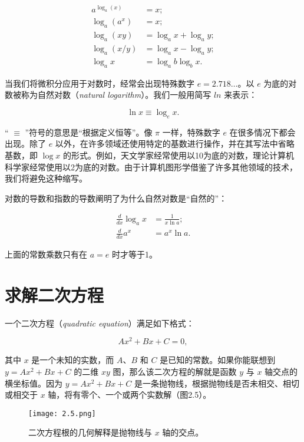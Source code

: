 \documentclass[lang=cn,12pt]{elegantbook}
\begin{document}
$$
  \begin{aligned}
    a^{\log_a(x)} & = x;               \\
    \log_a(a^x)   & = x;               \\
    \log_a(xy)    & = \log_ax+\log_ay; \\
    \log_a(x/y)   & = \log_ax-\log_ay; \\
    \log_ax       & = \log_ab\log_bx.
  \end{aligned}
$$

当我们将微积分应用于对数时，经常会出现特殊数字 $e=2.718\ldots $。以 $e$ 为底的对数被称为自然对数（\textit{natural logarithm}）。我们一般用简写 $ln$ 来表示：

$$\ln x \equiv \log_ex.$$

“ $\equiv$ ”符号的意思是“根据定义恒等”。像 $\pi$ 一样，特殊数字 $e$ 在很多情况下都会出现。除了 $e$ 以外，在许多领域还使用特定的基数进行操作，并在其写法中省略基数，即 $\log x$ 的形式。例如，天文学家经常使用以10为底的对数，理论计算机科学家经常使用以2为底的对数。由于计算机图形学借鉴了许多其他领域的技术，我们将避免这种缩写。

对数的导数和指数的导数阐明了为什么自然对数是“自然的”：

$$
  \begin{aligned}
    \frac{d}{d x} \log _{a} x & =\frac{1}{x \ln a}; \\
    \frac{d}{d x} a^{x}       & =a^{x} \ln a.
  \end{aligned}
$$

上面的常数乘数只有在 $a = e$ 时才等于1。

\section{求解二次方程}

一个二次方程（\textit{quadratic equation}）满足如下格式：

$$ Ax^2+Bx+C=0, $$

其中 $x$ 是一个未知的实数，而 $A$、$B$ 和 $C$ 是已知的常数。如果你能联想到 $y=Ax^2+Bx+C$ 的二维 $xy$ 图，那么该二次方程的解就是函数 $y$ 与 $x$ 轴交点的横坐标值。因为 $y=Ax^2+Bx+C$ 是一条抛物线，根据抛物线是否未相交、相切或相交于 $x$ 轴，将有零个、一个或两个实数解（图2.5）。

\begin{figure}[htbp]
  \centering
  \texttt{[image: 2.5.png]}
  \caption{二次方程根的几何解释是抛物线与 $x$ 轴的交点。}
\end{figure}
\end{document}
